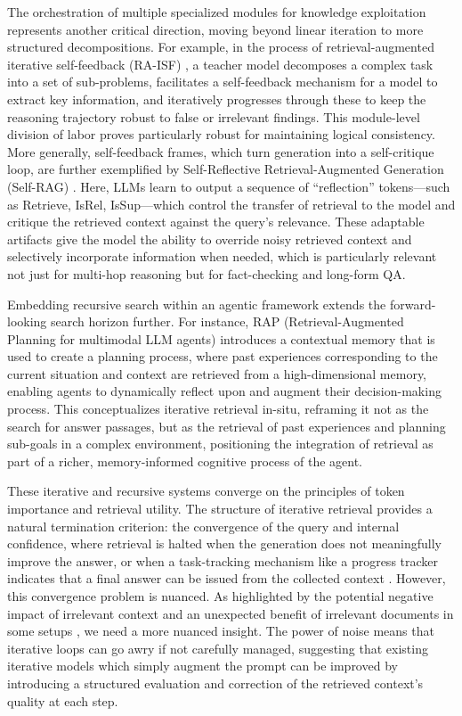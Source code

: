 \documentclass[11pt,a4paper]{article}
\begin{document}
The orchestration of multiple specialized modules for knowledge exploitation represents another critical direction, moving beyond linear iteration to more structured decompositions. For example, in the process of retrieval-augmented iterative self-feedback (RA-ISF) \cite{arxiv:2403.06840v1}, a teacher model decomposes a complex task into a set of sub-problems, facilitates a self-feedback mechanism for a model to extract key information, and iteratively progresses through these to keep the reasoning trajectory robust to false or irrelevant findings. This module-level division of labor proves particularly robust for maintaining logical consistency. More generally, self-feedback frames, which turn generation into a self-critique loop, are further exemplified by Self-Reflective Retrieval-Augmented Generation (Self-RAG) \cite{arxiv:2310.11511v1}. Here, LLMs learn to output a sequence of ``reflection'' tokens---such as Retrieve, IsRel, IsSup---which control the transfer of retrieval to the model and critique the retrieved context against the query's relevance. These adaptable artifacts give the model the ability to override noisy retrieved context and selectively incorporate information when needed, which is particularly relevant not just for multi-hop reasoning but for fact-checking and long-form QA.

Embedding recursive search within an agentic framework extends the forward-looking search horizon further. For instance, RAP (Retrieval-Augmented Planning for multimodal LLM agents) \cite{arxiv:2402.03610v1} introduces a contextual memory that is used to create a planning process, where past experiences corresponding to the current situation and context are retrieved from a high-dimensional memory, enabling agents to dynamically reflect upon and augment their decision-making process. This conceptualizes iterative retrieval in-situ, reframing it not as the search for answer passages, but as the retrieval of past experiences and planning sub-goals in a complex environment, positioning the integration of retrieval as part of a richer, memory-informed cognitive process of the agent.

These iterative and recursive systems converge on the principles of token importance and retrieval utility. The structure of iterative retrieval provides a natural termination criterion: the convergence of the query and internal confidence, where retrieval is halted when the generation does not meaningfully improve the answer, or when a task-tracking mechanism like a progress tracker indicates that a final answer can be issued from the collected context \cite{arxiv:2405.13021v1}. However, this convergence problem is nuanced. As highlighted by the potential negative impact of irrelevant context \cite{arxiv:2310.01558v1} and an unexpected benefit of irrelevant documents in some setups \cite{arxiv:2401.14887v3}, we need a more nuanced insight. The power of noise means that iterative loops can go awry if not carefully managed, suggesting that existing iterative models which simply augment the prompt can be improved by introducing a structured evaluation and correction of the retrieved context's quality at each step.
\end{document}
